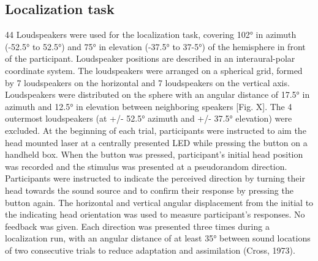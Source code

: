 \subsection{Localization task} 
44 Loudspeakers were used for the localization task, covering 102° in azimuth (-52.5° to 52.5°) and 75° in elevation (-37.5° to 37-5°) of the hemisphere in front of the participant. Loudspeaker positions are described in an interaural-polar coordinate system. The loudspeakers were arranged on a spherical grid, formed by 7 loudspeakers on the horizontal and 7 loudspeakers on the vertical axis. Loudspeakers were distributed on the sphere with an angular distance of 17.5° in azimuth and 12.5° in elevation between neighboring speakers [Fig. X]. The 4 outermost loudspeakers (at +/- 52.5° azimuth and +/- 37.5° elevation) were excluded. At the beginning of each trial, participants were instructed to aim the head mounted laser at a centrally presented LED while pressing the button on a handheld box. When the button was pressed, participant’s initial head position was recorded and the stimulus was presented at a pseudorandom direction. Participants were instructed to indicate the perceived direction by turning their head towards the sound source and to confirm their response by pressing the button again. The horizontal and vertical angular displacement from the initial to the indicating head orientation was used to measure participant’s responses. No feedback was given. Each direction was presented three times during a localization run, with an angular distance of at least 35° between sound locations of two consecutive trials to reduce adaptation and assimilation (Cross, 1973). 
